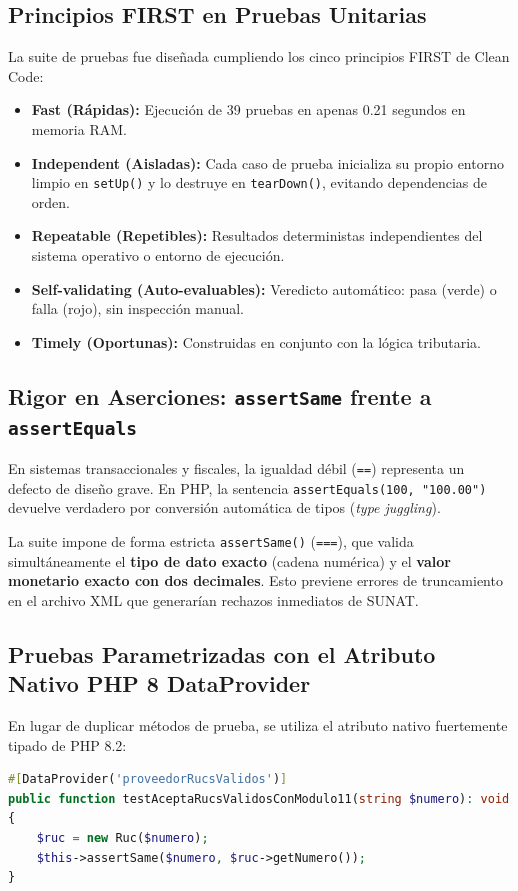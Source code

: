 \documentclass[11pt,a4paper]{article}
\begin{document}
\subsection{Principios FIRST en Pruebas Unitarias}
La suite de pruebas fue diseñada cumpliendo los cinco principios FIRST de Clean Code:
\begin{itemize}[noitemsep]
    \item \textbf{Fast (Rápidas):} Ejecución de 39 pruebas en apenas 0.21 segundos en memoria RAM.
    \item \textbf{Independent (Aisladas):} Cada caso de prueba inicializa su propio entorno limpio en \texttt{setUp()} y lo destruye en \texttt{tearDown()}, evitando dependencias de orden.
    \item \textbf{Repeatable (Repetibles):} Resultados deterministas independientes del sistema operativo o entorno de ejecución.
    \item \textbf{Self-validating (Auto-evaluables):} Veredicto automático: pasa (verde) o falla (rojo), sin inspección manual.
    \item \textbf{Timely (Oportunas):} Construidas en conjunto con la lógica tributaria.
\end{itemize}

\subsection{Rigor en Aserciones: \texttt{assertSame} frente a \texttt{assertEquals}}
En sistemas transaccionales y fiscales, la igualdad débil (\texttt{==}) representa un defecto de diseño grave. En PHP, la sentencia \texttt{assertEquals(100, "100.00")} devuelve verdadero por conversión automática de tipos (\textit{type juggling}). 

La suite impone de forma estricta \texttt{assertSame()} (\texttt{===}), que valida simultáneamente el \textbf{tipo de dato exacto} (cadena numérica) y el \textbf{valor monetario exacto con dos decimales}. Esto previene errores de truncamiento en el archivo XML que generarían rechazos inmediatos de SUNAT.

\subsection{Pruebas Parametrizadas con el Atributo Nativo PHP 8 DataProvider}
En lugar de duplicar métodos de prueba, se utiliza el atributo nativo fuertemente tipado de PHP 8.2:
\begin{lstlisting}[language=PHP, caption={Pruebas parametrizadas de validacion de RUC con DataProvider.}]
#[DataProvider('proveedorRucsValidos')]
public function testAceptaRucsValidosConModulo11(string $numero): void
{
    $ruc = new Ruc($numero);
    $this->assertSame($numero, $ruc->getNumero());
}
\end{lstlisting}
\end{document}
